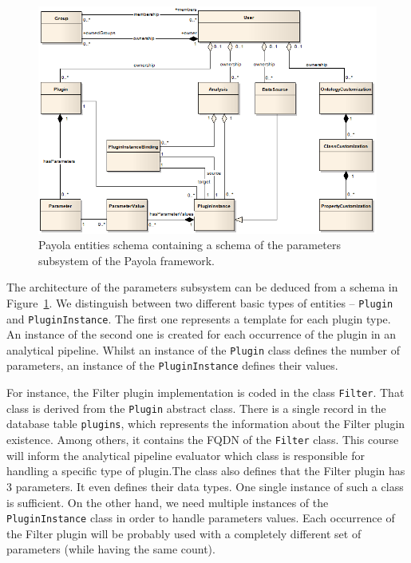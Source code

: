 \begin{figure}
	\centering
	\includegraphics[width=140mm]{img/params-schema.png}
	\caption{Payola entities schema containing a schema of the parameters 
	subsystem of the Payola framework.~\cite{payola:dg}}
	\label{fig:params-schema}
\end{figure}

The architecture of the parameters subsystem can be deduced
from a schema in Figure~\ref{fig:params-schema}. We distinguish between two 
different basic types of entities -- \texttt{Plugin} and \texttt{PluginInstance}. The first 
one represents a template for each plugin type. An instance of the second one is created for
each occurrence of the plugin in an analytical pipeline. Whilst an instance of the \texttt{Plugin}
class defines the number of parameters, an instance of the \texttt{PluginInstance} 
defines their values.

For instance, the Filter plugin implementation is coded in the class \texttt{Filter}.
That class is derived from the \texttt{Plugin} abstract class. There is a single record in the database table
\texttt{plugins}, which represents the information about the Filter plugin existence.
Among others, it contains the FQDN of the \texttt{Filter} class. This course will inform the analytical
pipeline evaluator which class is responsible for handling
a specific type of plugin.The class also defines that the Filter plugin has 3 parameters. It even 
defines their data types. One single instance of such a class is sufficient. On the other hand, we need
multiple instances of the \texttt{PluginInstance} class in order to
handle parameters values. Each occurrence of the Filter plugin will be probably 
used with a completely different set of parameters (while having the same count).

